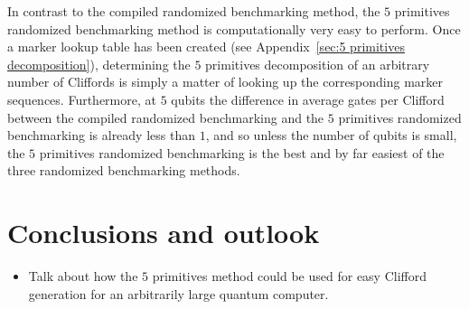           In contrast to the compiled randomized benchmarking method, the $5$ primitives randomized benchmarking method is computationally very easy to perform. Once a marker lookup table has been created (see Appendix~\ref{sec:5 primitives decomposition}), determining the $5$ primitives decomposition of an arbitrary number of Cliffords is simply a matter of looking up the corresponding marker sequences. Furthermore, at $5$ qubits the difference in average gates per Clifford between the compiled randomized benchmarking and the $5$ primitives randomized benchmarking is already less than $1$, and so unless the number of qubits is small, the $5$ primitives randomized benchmarking is the best and by far easiest of the three randomized benchmarking methods.


  \chapter{Conclusions and outlook}
    \begin{itemize}
      \item Talk about how the $5$ primitives method could be used for easy Clifford generation for an arbitrarily large quantum computer.
    \end{itemize}